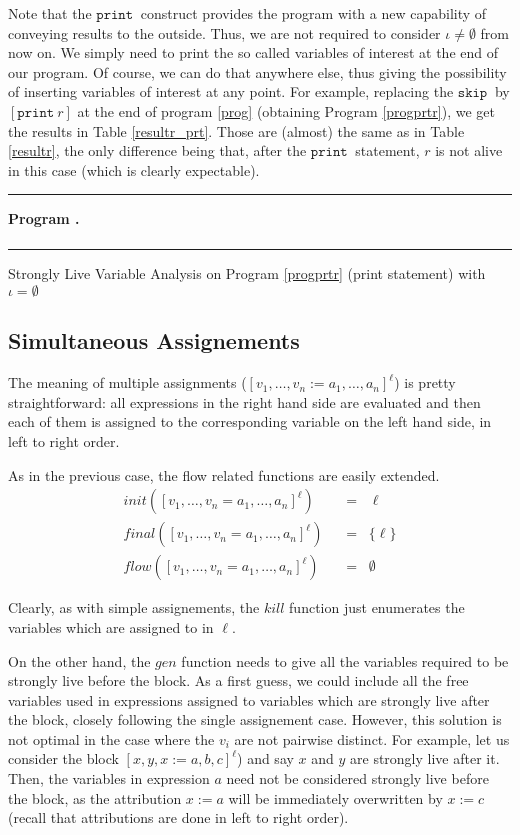\documentclass[a4wide,12pt]{article}
\def\eq{\;\; = \;\;}
\def\skip {\texttt{skip}\ }
\def\print{\texttt{print}\ }
\newcounter{Progenvcount}
\newenvironment{progenv}
                {\refstepcounter{Progenvcount} \nopagebreak
                 \bigskip\hrule\nopagebreak\medskip\noindent
                 {\bf Program \arabic{Progenvcount}.} \nopagebreak\vspace{0.3cm} \nopagebreak \\ \nopagebreak
                  \nopagebreak
                 $\begin{array}{ll}}
                {\end{array}$ \bigskip\hrule\bigskip\bigskip }
\def\restabRtiny#1#2[#3]{
\begin{table}
{\tiny
\caption{#1}\label{#3}
\begin{center}\begin{sideways}\end{sideways}\end{center}
}
\end{table}}
\def\program#1[#2]{\begin{progenv}\label{#2}\end{progenv}}
\begin{document}
Note that the $\print$ construct provides the program with a new capability of conveying
results to the outside. Thus, we are not required to consider $\iota \neq \emptyset$ from now on.
We simply need to print the so called variables of interest at the end of our program.
Of course, we can do that anywhere else, thus giving the possibility of inserting
variables of interest at any point.
For example, replacing the $\skip$ by  $[\print r]$ at the end of program \ref{prog}
(obtaining Program \ref{progprtr}),
we get the results in Table \ref{resultr_prt}. Those are (almost) the
same as in Table \ref{resultr}, the only difference being that, after the $\print$ statement,
$r$ is not alive in this case (which is clearly expectable).
 
\program{progprtr.tex}[progprtr]

\restabRtiny{Strongly Live Variable Analysis on Program \ref{progprtr} (print statement) with $\iota = \emptyset$}{resultr_prt.tex}[resultr_prt]
 
\subsection{Simultaneous Assignements}
 
The meaning of multiple assignments ($[v_1,\ldots,v_n := a_1,\ldots,a_n]^\ell$) is
pretty straightforward: all expressions in the right hand side are evaluated and
then each of them is assigned to the corresponding variable on the left hand side, in left to right order.
 
As in the previous case, the flow related functions are easily extended.
\begin{align*}
init ([v_1,\ldots,v_n = a_1,\ldots,a_n]^\ell) & \eq \ell \\
final([v_1,\ldots,v_n = a_1,\ldots,a_n]^\ell) & \eq \{\ell\} \\
flow ([v_1,\ldots,v_n = a_1,\ldots,a_n]^\ell) & \eq \emptyset
\end{align*}
 
Clearly, as with simple assignements, the $kill$
function just enumerates the variables which are assigned to in $\ell$.
 
On the other hand, the
$gen$ function needs to give all the variables required to be strongly live before the block.
As a first guess, we could include all the
free variables used in expressions assigned to variables which are strongly live after the block, closely following the
single assignement case. However, this solution is not optimal in the case where the $v_i$ are not pairwise distinct.
For example, let us consider the block $[x,y,x := a,b,c]^\ell$) and say $x$ and $y$ are
strongly live after it. Then, the variables in expression
$a$ need not be considered strongly live before the block, as the attribution $x:=a$ will be immediately overwritten
by $x:=c$ (recall that attributions are done in left to right order).
 
\end{document}

